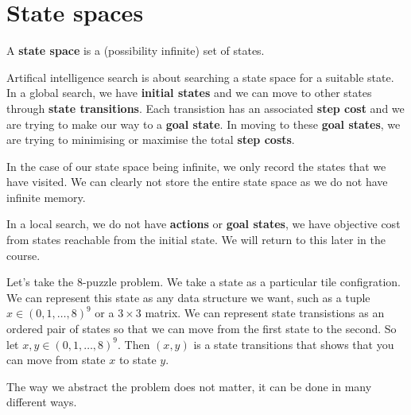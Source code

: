 \chapter{State spaces}

\begin{definition}
    A \textbf{state space} is a (possibility infinite) set of states.
\end{definition}

Artifical intelligence search is about searching a state space for a suitable state. In a global search, we have \textbf{initial states} and we can move to other states through \textbf{state transitions}. Each transistion has an associated \textbf{step cost} and we are trying to make our way to a \textbf{goal state}. In moving to these \textbf{goal states}, we are trying to minimising or maximise the total \textbf{step costs}.

In the case of our state space being infinite, we only record the states that we have visited. We can clearly not store the entire state space as we do not have infinite memory.

In a local search, we do not have \textbf{actions} or \textbf{goal states}, we have objective cost from states reachable from the initial state. We will return to this later in the course.

\begin{example}
    Let's take the 8-puzzle problem. We take a state as a particular tile configration. We can represent this state as any data structure we want, such as a tuple $x \in (0, 1, \ldots, 8)^9$ or a $3 \times 3$ matrix. We can represent state transistions as an ordered pair of states so that we can move from the first state to the second. So let $x, y \in (0, 1, \ldots, 8)^9$. Then $(x, y)$ is a state transitions that shows that you can move from state $x$ to state $y$. 
\end{example}

\begin{remark}
    The way we abstract the problem does not matter, it can be done in many different ways.
\end{remark}

